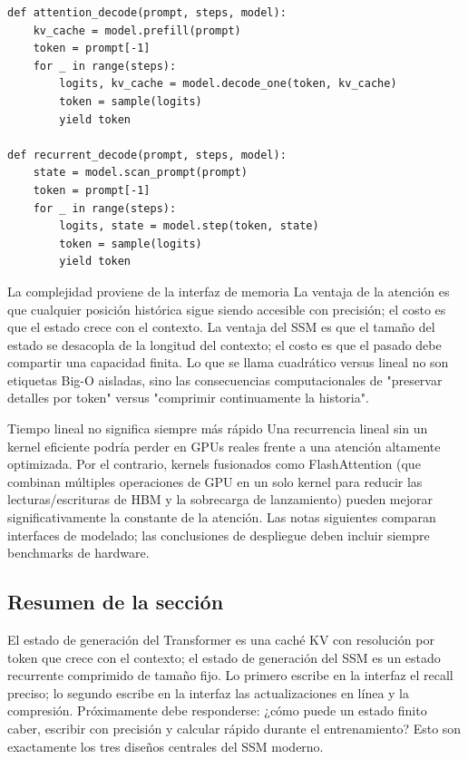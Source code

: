 \begin{lstlisting}[caption={Comparación de interfaces de decodificación entre caché de atención y estado recurrente}]
def attention_decode(prompt, steps, model):
    kv_cache = model.prefill(prompt)
    token = prompt[-1]
    for _ in range(steps):
        logits, kv_cache = model.decode_one(token, kv_cache)
        token = sample(logits)
        yield token

def recurrent_decode(prompt, steps, model):
    state = model.scan_prompt(prompt)
    token = prompt[-1]
    for _ in range(steps):
        logits, state = model.step(token, state)
        token = sample(logits)
        yield token
\end{lstlisting}

\begin{importantbox}{La complejidad proviene de la interfaz de memoria}
La ventaja de la atención es que cualquier posición histórica sigue siendo accesible con precisión; el costo es que el estado crece con el contexto. La ventaja del SSM es que el tamaño del estado se desacopla de la longitud del contexto; el costo es que el pasado debe compartir una capacidad finita. Lo que se llama cuadrático versus lineal no son etiquetas Big-O aisladas, sino las consecuencias computacionales de "preservar detalles por token" versus "comprimir continuamente la historia".
\end{importantbox}

\begin{warningbox}{Tiempo lineal no significa siempre más rápido}
Una recurrencia lineal sin un kernel eficiente podría perder en GPUs reales frente a una atención altamente optimizada. Por el contrario, kernels fusionados como FlashAttention (que combinan múltiples operaciones de GPU en un solo kernel para reducir las lecturas/escrituras de HBM y la sobrecarga de lanzamiento) pueden mejorar significativamente la constante de la atención. Las notas siguientes comparan interfaces de modelado; las conclusiones de despliegue deben incluir siempre benchmarks de hardware.
\end{warningbox}

\subsection{Resumen de la sección}

El estado de generación del Transformer es una caché KV con resolución por token que crece con el contexto; el estado de generación del SSM es un estado recurrente comprimido de tamaño fijo. Lo primero escribe en la interfaz el recall preciso; lo segundo escribe en la interfaz las actualizaciones en línea y la compresión. Próximamente debe responderse: ¿cómo puede un estado finito caber, escribir con precisión y calcular rápido durante el entrenamiento? Esto son exactamente los tres diseños centrales del SSM moderno.
